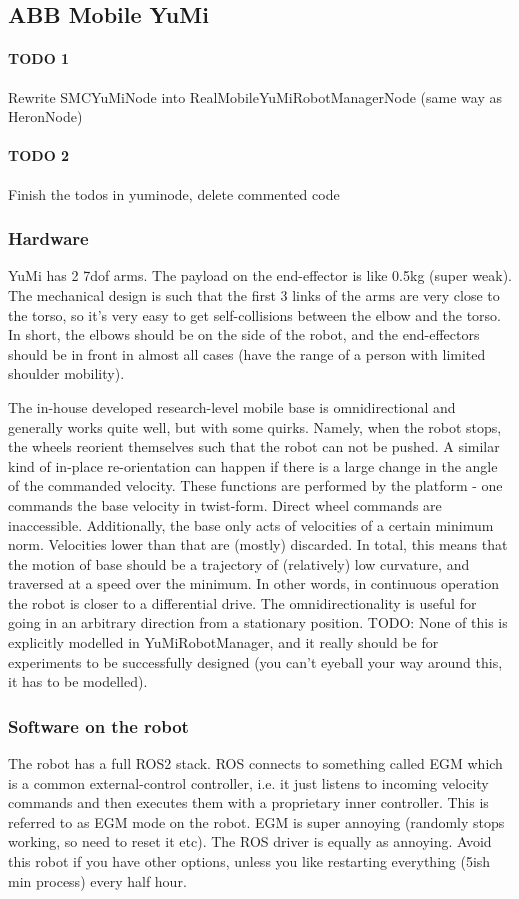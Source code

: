 \subsection{ABB Mobile YuMi}
\paragraph{TODO 1} Rewrite SMCYuMiNode into RealMobileYuMiRobotManagerNode (same way as HeronNode)
\paragraph{TODO 2} Finish the todos in yuminode, delete commented code

\subsubsection{Hardware}
YuMi has 2 7dof arms. The payload on the end-effector is like 0.5kg (super weak).
The mechanical design is such that the first 3 links of the arms are very close
to the torso, so it's very easy to get self-collisions between the elbow and the torso.
In short, the elbows should be on the side of the robot,
and the end-effectors should be in front in almost all cases
(have the range of a person with limited shoulder mobility).

The in-house developed research-level mobile base
is omnidirectional and generally works quite well, 
but with some quirks. Namely,
when the robot stops, the wheels reorient themselves
such that the robot can not be pushed.
A similar kind of in-place re-orientation can happen 
if there is a large change in the angle of the commanded velocity.
These functions are performed by the platform - one commands
the base velocity in twist-form. Direct wheel commands are inaccessible.
Additionally, the base only acts of velocities of a certain minimum norm.
Velocities lower than that are (mostly) discarded.
In total, this means that the motion of base should be a trajectory
of (relatively) low curvature, and traversed at a speed
over the minimum. In other words, in continuous operation the robot
is closer to a differential drive. The omnidirectionality is useful
for going in an arbitrary direction from a stationary position.
TODO: None of this is explicitly modelled in YuMiRobotManager,
and it really should be for experiments to be successfully designed
(you can't eyeball your way around this, it has to be modelled).


\subsubsection{Software on the robot}
The robot has a full ROS2 stack.
ROS connects to something called EGM which
is a common external-control controller, i.e. it just listens
to incoming velocity commands and then executes
them with a proprietary inner controller. This is referred to as EGM mode on the robot.
EGM is super annoying (randomly stops working, so need to reset it 
etc). The ROS driver is equally as annoying. Avoid this robot if you have other options,
unless you like restarting everything (5ish min process) every half hour.


